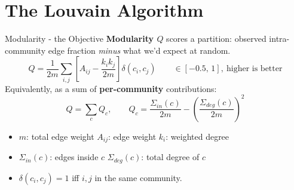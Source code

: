 \documentclass[aspectratio=169]{beamer}
\begin{document}
\section{The Louvain Algorithm}

\begin{frame}{Modularity - the Objective}
    \textbf{Modularity $Q$} scores a partition: observed intra-community edge fraction
    \emph{minus} what we'd expect at random.
    \[
        Q = \frac{1}{2m}\sum_{i,j}\left[A_{ij} - \frac{k_i k_j}{2m}\right]\delta(c_i,c_j)
        \qquad\in[-0.5,\,1],\ \text{higher is better}
    \]
    Equivalently, as a sum of \textbf{per-community} contributions:
    \[
        Q = \sum_c Q_c, \qquad
        Q_c = \frac{\Sigma_{in}(c)}{2m} - \left(\frac{\Sigma_{deg}(c)}{2m}\right)^{2}
    \]
    \begin{itemize}\small
        \item $m$: total edge weight \quad $A_{ij}$: edge weight \quad $k_i$: weighted degree
        \item $\Sigma_{in}(c)$: edges inside $c$ \quad $\Sigma_{deg}(c)$: total degree of $c$
        \item $\delta(c_i,c_j)=1$ iff $i,j$ in the same community.
    \end{itemize}
\end{frame}
\end{document}
